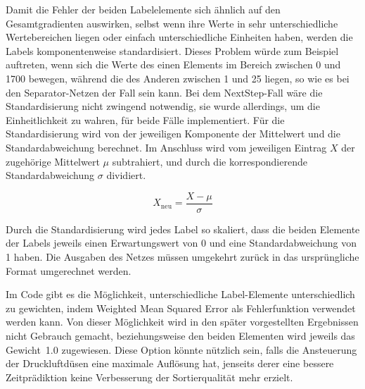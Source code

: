 Damit die Fehler der beiden Labelelemente sich ähnlich auf den Gesamtgradienten auswirken,
selbst wenn ihre Werte in sehr unterschiedliche Wertebereichen liegen oder einfach unterschiedliche Einheiten haben, werden die Labels komponentenweise standardisiert.
Dieses Problem würde zum Beispiel auftreten, wenn sich die Werte des einen Elements im Bereich zwischen 0 und 1700 bewegen, während die des Anderen zwischen 1 und 25 liegen,
so wie es bei den Separator-Netzen der Fall sein kann.
Bei dem NextStep-Fall wäre die Standardisierung nicht zwingend notwendig, 
sie wurde allerdings, um die Einheitlichkeit zu wahren, für beide Fälle implementiert. 
Für die Standardisierung wird von der jeweiligen Komponente der Mittelwert und die Standardabweichung berechnet. 
Im Anschluss wird vom jeweiligen Eintrag \(X\) der zugehörige Mittelwert \(\mu\) subtrahiert, und durch die korrespondierende Standardabweichung \(\sigma\) dividiert.
	
\begin{equation*}
	X_{\text{neu}} = \frac{X - \mu}{\sigma} %
\end{equation*}

Durch die Standardisierung wird jedes Label so skaliert, dass die beiden Elemente der Labels jeweils einen Erwartungswert von 0 und eine Standardabweichung von 1 haben.
Die Ausgaben des Netzes müssen umgekehrt zurück in das ursprüngliche Format umgerechnet werden.

Im Code gibt es die Möglichkeit, unterschiedliche Label-Elemente unterschiedlich zu gewichten, indem Weighted Mean Squared Error als Fehlerfunktion verwendet werden kann. 
Von dieser Möglichkeit wird in den später vorgestellten Ergebnissen nicht Gebrauch gemacht, beziehungsweise den beiden Elementen wird jeweils das Gewicht~1.0 zugewiesen.
Diese Option könnte nützlich sein, falls die Ansteuerung der Druckluftdüsen eine maximale Auflösung hat, jenseits derer eine bessere Zeitprädiktion keine Verbesserung der Sortierqualität mehr erzielt.






